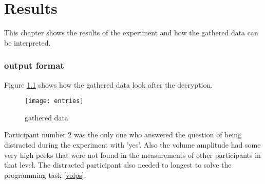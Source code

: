 \chapter{Results}
This chapter shows the results of the experiment and how the gathered data can be interpreted. 


\subsection{output format}
Figure \ref{entries} shows how the gathered data look after the decryption. 

\begin{figure}[!htb]
\centering
\texttt{[image: entries]}
\caption{gathered data}\label{entries}
\vspace{10 mm}
\end{figure}

\FloatBarrier

\bigbreak

Participant number 2 was the only one who answered the question of being distracted during the experiment with 'yes'. Also the volume amplitude had some very high peeks that were not found in the measurements of other participants in that level. The distracted participant also needed to longest to solve the programming task \ref{volps}. 

